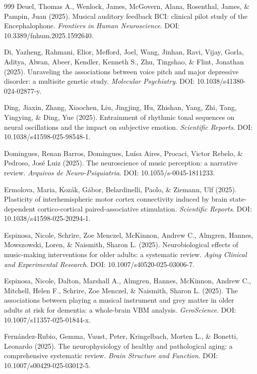 \documentclass[9pt,onecolumn]{article}
\begin{document}
\begin{thebibliography}{999}
Deuel, Thomas A., Wenlock, James, McGovern, Alana, Rosenthal, James, \& Pampin, Juan (2025). Musical auditory feedback BCI: clinical pilot study of the Encephalophone. \textit{Frontiers in Human Neuroscience}. DOI: 10.3389/fnhum.2025.1592640.

Di, Yazheng, Rahmani, Elior, Mefford, Joel, Wang, Jinhan, Ravi, Vijay, Gorla, Aditya, Alwan, Abeer, Kendler, Kenneth S., Zhu, Tingshao, \& Flint, Jonathan (2025). Unraveling the associations between voice pitch and major depressive disorder: a multisite genetic study. \textit{Molecular Psychiatry}. DOI: 10.1038/s41380-024-02877-y.

Ding, Jiaxin, Zhang, Xiaochen, Liu, Jingjing, Hu, Zhishan, Yang, Zhi, Tang, Yingying, \& Ding, Yue (2025). Entrainment of rhythmic tonal sequences on neural oscillations and the impact on subjective emotion. \textit{Scientific Reports}. DOI: 10.1038/s41598-025-98548-1.

Domingues, Renan Barros, Domingues, Luísa Aires, Procaci, Victor Rebelo, \& Pedroso, José Luiz (2025). The neuroscience of music perception: a narrative review. \textit{Arquivos de Neuro-Psiquiatria}. DOI: 10.1055/s-0045-1811233.

Ermolova, Maria, Kozák, Gábor, Belardinelli, Paolo, \& Ziemann, Ulf (2025). Plasticity of interhemispheric motor cortex connectivity induced by brain state-dependent cortico-cortical paired-associative stimulation. \textit{Scientific Reports}. DOI: 10.1038/s41598-025-20294-1.

Espinosa, Nicole, Schrire, Zoe Menczel, McKinnon, Andrew C., Almgren, Hannes, Mowszowski, Loren, \& Naismith, Sharon L. (2025). Neurobiological effects of music-making interventions for older adults: a systematic review. \textit{Aging Clinical and Experimental Research}. DOI: 10.1007/s40520-025-03006-7.

Espinosa, Nicole, Dalton, Marshall A., Almgren, Hannes, McKinnon, Andrew C., Mitchell, Helen F., Schrire, Zoe Menczel, \& Naismith, Sharon L. (2025). The associations between playing a musical instrument and grey matter in older adults at risk for dementia: a whole-brain VBM analysis. \textit{GeroScience}. DOI: 10.1007/s11357-025-01844-x.

Fernández-Rubio, Gemma, Vuust, Peter, Kringelbach, Morten L., \& Bonetti, Leonardo (2025). The neurophysiology of healthy and pathological aging: a comprehensive systematic review. \textit{Brain Structure and Function}. DOI: 10.1007/s00429-025-03012-5.


\end{thebibliography}
\end{document}
